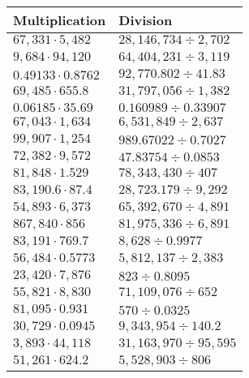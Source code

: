 \begin{longtable}[]{@{}ll@{}}
\toprule
Multiplication & Division\tabularnewline
\midrule
\endhead
\(67,331\cdot5,482\) & \(28,146,734÷2,702\)\tabularnewline
\(9,684\cdot94,120\) & \(64,404,231÷3,119\)\tabularnewline
\(0.49133\cdot0.8762\) & \(92,770.802÷41.83\)\tabularnewline
\(69,485\cdot655.8\) & \(31,797,056÷1,382\)\tabularnewline
\(0.06185\cdot 35.69\) & \(0.160989÷0.33907\)\tabularnewline
\(67,043\cdot1,634\) & \(6,531,849÷2,637\)\tabularnewline
\(99,907\cdot1,254\) & \(989.67022÷0.7027\)\tabularnewline
\(72,382\cdot9,572\) & \(47.83754÷0.0853\)\tabularnewline
\(81,848\cdot1.529\) & \(78,343,430÷407\)\tabularnewline
\(83,190.6\cdot87.4\) & \(28,723.179÷9,292\)\tabularnewline
\(54,893\cdot6,373\) & \(65,392,670÷4,891\)\tabularnewline
\(867,840\cdot856\) & \(81,975,336÷6,891\)\tabularnewline
\(83,191\cdot769.7\) & \(8,628÷0.9977\)\tabularnewline
\(56,484\cdot0.5773\) & \(5,812,137÷2,383\)\tabularnewline
\(23,420\cdot7,876\) & \(823÷0.8095\)\tabularnewline
\(55,821\cdot 8,830\) & \(71,109,076÷652\)\tabularnewline
\(81,095\cdot0.931\) & \(570÷0.0325\)\tabularnewline
\(30,729\cdot0.0945\) & \(9,343,954÷140.2\)\tabularnewline
\(3,893\cdot44,118\) & \(31,163,970÷95,595\)\tabularnewline
\(51,261\cdot 624.2\) & \(5,528,903÷806\)\tabularnewline
\bottomrule
\end{longtable}
